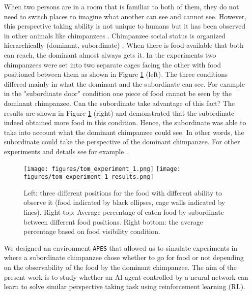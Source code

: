 \documentclass{article}
\begin{document}
\par When two persons are in a room that is familiar to both of them, they do not need to switch places to imagine what another can see and cannot see. However, this perspective taking ability is not unique to humans but it has been observed in other animals like chimpanzees \cite{hare2000chimpanzees}. Chimpanzee social status is organized hierarchically (dominant, subordinate) \cite{goldberg1997genetic}. When there is food available that both can reach, the dominant almost always gets it. In the experiments \cite{hare2000chimpanzees}  two chimpanzees were set into two separate cages facing the other with food positioned between them as shown in Figure \ref{tom.experiment} (left). The three conditions differed mainly in what the dominant and the subordinate can see. For example in the "subordinate door" condition one piece of food cannot be seen by the dominant chimpanzee. Can the subordinate take advantage of this fact? The results are shown in Figure \ref{tom.experiment} (right) and demonstrated that the subordinate indeed obtained more food in this condition. Hence, the subordinate was able to take into account what the dominant chimpanzee could see. In other words, the subordinate could take the perspective of the dominant chimpanzee. For other experiments and details see for example \cite{hare2000chimpanzees, de2016we, tomasello2009cultural}.  

\begin{figure}[!ht]
\begin{center}
\texttt{[image: figures/tom\_experiment\_1.png]}
\texttt{[image: figures/tom\_experiment\_1\_results.png]}
\caption{Left: three different positions for the food with different ability to observe it (food indicated by black ellipses, cage walls indicated by lines). Right top: Average percentage of eaten food by subordinate between different food positions. Right bottom: the average percentage based on food visibility condition. \cite{hare2000chimpanzees}}
\label{tom.experiment}
\end{center}
\end{figure}

We designed an environment \texttt{APES} that allowed us to simulate experiments in \cite{hare2000chimpanzees} where a subordinate chimpanzee chose whether to go for food or not depending on the observability of the food by the dominant chimpanzee. The aim of the present work is to study whether an AI agent controlled by a neural network can learn to solve similar perspective taking task using reinforcement learning (RL).
\end{document}
